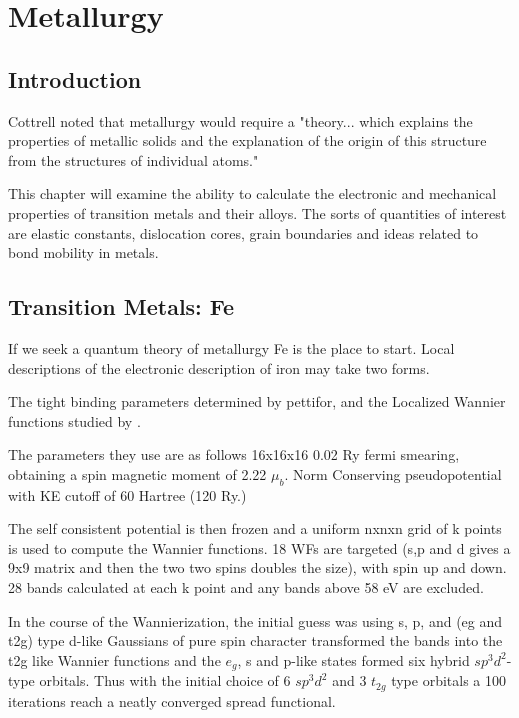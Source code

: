 \chapter{Metallurgy}
\label{chap:metallurgy}
\section{Introduction}
Cottrell noted that metallurgy would require a "theory... which explains
the properties of metallic solids and the explanation of the origin of this
structure from the structures of individual atoms." 

This chapter will examine the ability to calculate the electronic and mechanical
properties of transition metals and their alloys. The sorts of quantities
of interest are elastic constants, dislocation cores, grain boundaries
and ideas related to bond mobility in metals.





\section{Transition Metals: Fe}
If we seek a quantum theory of metallurgy Fe is the place to start.
Local descriptions of the electronic description of iron may take two forms. 

The tight binding parameters determined by pettifor, and the Localized 
Wannier functions studied by \cite{yates06}. 

The parameters they use are as follows 16x16x16 0.02 Ry fermi smearing, obtaining
a spin magnetic moment of 2.22 $\mu_{b}$. Norm Conserving pseudopotential with KE cutoff
of 60 Hartree (120 Ry.)

The self consistent potential is then frozen and a uniform nxnxn grid of k points is
used to compute the Wannier functions. 18 WFs are targeted (s,p and d gives a 9x9 matrix
and then the two two spins doubles the size), with spin up and 
down. 28 bands calculated at each k point and any bands above 58 eV are excluded.

In the course of the Wannierization, the initial guess was using s, p, and (eg and t2g)
type d-like Gaussians of pure spin character transformed the bands into the t2g like 
Wannier functions and the $e_{g}$, s and p-like states formed six hybrid 
$sp^{3}d^{2}$-type orbitals. Thus with the initial choice of 6 $sp^{3}d^{2}$ and 3 
$t_{2g}$  type orbitals a 100 iterations reach a neatly converged spread functional.

